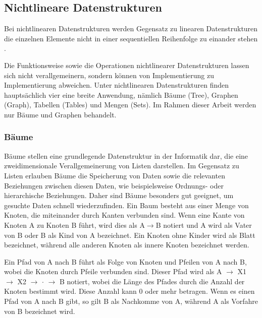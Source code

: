 \subsection{Nichtlineare Datenstrukturen} \label{nicht_lineare_datenstrukturen}
Bei nichtlinearen Datenstrukturen werden Gegensatz zu linearen Datenstrukturen die einzelnen Elemente nicht in einer sequentiellen Reihenfolge zu einander stehen \autocite[321]{hoffmann_einfuhrung_2011}. 

Die Funktionsweise sowie die Operationen nichtlinearer Datenstrukturen lassen sich nicht verallgemeinern, sondern können von Implementierung zu Implementierung abweichen. Unter nichtlinearen Datenstrukturen finden hauptsächlich vier eine breite Anwendung, nämlich Bäume (Tree), Graphen (Graph), Tabellen (Tables) und Mengen (Sets). Im Rahmen dieser Arbeit werden nur Bäume und Graphen behandelt.

\subsubsection{Bäume}
Bäume stellen eine grundlegende Datenstruktur in der Informatik dar, die eine zweidimensionale Verallgemeinerung von Listen darstellen. Im Gegensatz zu Listen erlauben Bäume die Speicherung von Daten sowie die relevanten Beziehungen zwischen diesen Daten, wie beispielsweise Ordnungs- oder hierarchische Beziehungen. Daher sind Bäume besonders gut geeignet, um gesuchte Daten schnell wiederzufinden. Ein Baum besteht aus einer Menge von Knoten, die miteinander durch Kanten verbunden sind. Wenn eine Kante von Knoten A zu Knoten B führt, wird dies als A$\rightarrow$B notiert und A wird als Vater von B oder B als Kind von A bezeichnet. Ein Knoten ohne Kinder wird als Blatt bezeichnet, während alle anderen Knoten als innere Knoten bezeichnet werden. \autocite[389]{gumm_band_2016}

Ein Pfad von A nach B führt als Folge von Knoten und Pfeilen von A nach B, wobei die Knoten durch Pfeile verbunden sind. Dieser Pfad wird als A $\rightarrow$ X1 $\rightarrow$ X2 $\rightarrow$ $\cdot$ $\rightarrow$ B notiert, wobei die Länge des Pfades durch die Anzahl der Knoten bestimmt wird. Diese Anzahl kann 0 oder mehr betragen. Wenn es einen Pfad von A nach B gibt, so gilt B als Nachkomme von A, während A als Vorfahre von B bezeichnet wird. \autocite[389]{gumm_band_2016}

